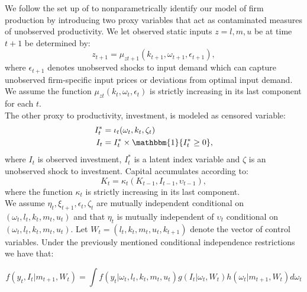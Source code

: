 \documentclass{article}
\begin{document}
We follow the set up of \cite{Hu2019} to nonparametrically identify our model of firm production by introducing two proxy variables that act as contaminated measures of unobserved productivity. We let observed static inputs $z=l,m,u$ be at time $t+1$ be determined by:
\begin{equation}\label{static+1}
    z_{t+1}=\mu_{zt+1}(k_{t+1},\omega_{t+1}, \epsilon_{t+1}),
\end{equation}
where $\epsilon_{t+1}$ denotes unobserved shocks to input demand which can capture unobserved firm-specific input prices or deviations from optimal input demand. We assume the function $\mu_{zt}(k_{t},\omega_{t}, \epsilon_{t})$ is strictly increasing in its last component for each $t$.\\

The other proxy to productivity, investment, is modeled as censored variable:
\begin{equation}\label{investment}
    \begin{split}
    I_{t}^{*}&=\iota_{t}(\omega_{t}, k_{t}, \zeta_{t})\\
    I_{t}&=I_{t}^{*}\times  \mathbbm{1}\{I_{t}^{*}\geq 0\},
    \end{split}
\end{equation}
where $I_{t}$ is observed investment, $I_{t}^{*}$ is a latent index variable and $\zeta$ is an unobserved shock to investment. Capital accumulates according to:
\begin{equation}\label{capitalhu}
    K_{t}=\kappa_{t}(K_{t-1}, I_{t-1}, \upsilon_{t-1}),
\end{equation}
where the function $\kappa_{t}$ is strictly increasing in its last component.\\

We assume $\eta_{t}, \xi_{t+1}, \epsilon_{t}, \zeta_{t}$ are mutually independent conditional on $(\omega_{t}, l_{t}, k_{t}, m_{t}, u_{t})$ and that $\eta_{t}$ is mutually independent of $\upsilon_{t}$ conditional on $(\omega_{t}, l_{t}, k_{t}, m_{t}, u_{t})$. Let $W_{t}=(l_{t}, k_{t}, m_{t}, u_{t}, k_{t+1})$ denote the vector of control variables. Under the previously mentioned conditional independence restrictions we have that:

\begin{equation}\label{identification}
    f(y_{t}, I_{t}|m_{t+1}, W_{t})=\int f(y_{t}|\omega_{t}, l_{t}, k_{t}, m_{t}, u_{t})g(I_{t}|\omega_{t}, W_{t})h(\omega_{t}|m_{t+1}, W_{t})d\omega_{t}
\end{equation}
\end{document}
